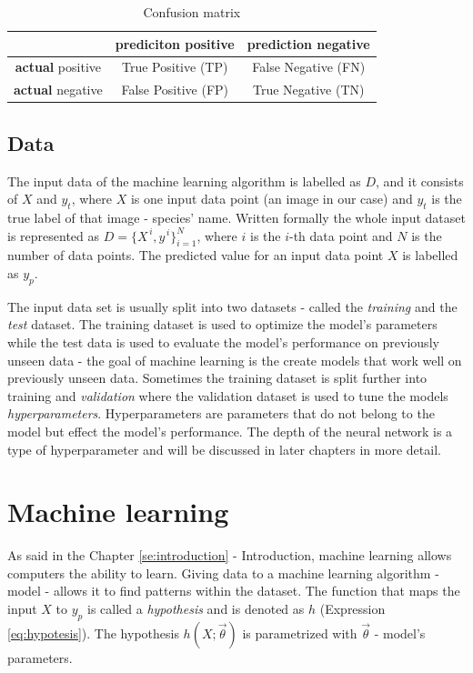 \documentclass[times, utf8, diplomski]{fer}
\begin{document}
\begin{table}
\centering
\caption{Confusion matrix}
\label{tb:confusion_matrix}
\begin{tabular}{|c|c|c|}
\hline 
 & \textbf{prediciton} positive & \textbf{prediction} negative \\ 
\hline 
\textbf{actual} positive & True Positive (TP) & False Negative (FN) \\ 
\hline 
\textbf{actual} negative & False Positive (FP) & True Negative (TN) \\ 
\hline 
\end{tabular}
\end{table}

\subsection{Data} \label{se:data}
The input data of the machine learning algorithm is labelled as $D$, and it consists of $X$ and $y_{t}$, where $X$ is one input data point (an image in our case) and $y_{t}$ is the true label of that image - species' name. Written formally the whole input dataset is represented as $D = \{{X}^{\,i},y^{\,i}\}^{N}_{i=1}$, where $i$ is the $i$-th data point and $N$ is the number of data points. The predicted value for an input data point $X$ is labelled as $y_{p}$.

The input data set is usually split into two datasets - called the \textit{training} and the \textit{test} dataset. The training dataset is used to optimize the model's parameters while the test data is used to evaluate the model's performance on previously unseen data - the goal of machine learning is the create models that work well on previously unseen data. Sometimes the training dataset is split further into training and \textit{validation} where the validation dataset is used to tune the models \textit{hyperparameters}. Hyperparameters are parameters that do not belong to the model but  effect the model's performance. The depth of the neural network is a type of hyperparameter and will be discussed in later chapters in more detail.


\section{Machine learning}
\label{se:machine_learning}

As said in the Chapter \ref{se:introduction} - Introduction, machine learning allows computers the ability to learn. Giving data to a machine learning algorithm - model - allows it to find patterns within the dataset. The function that maps the input $X$ to $y_p$ is called a \textit{hypothesis} and is denoted as $h$ (Expression \ref{eq:hypotesis}). The hypothesis $h(X ; \vec{\theta})$ is parametrized with $\vec{\theta}$ - model's parameters.
\end{document}
